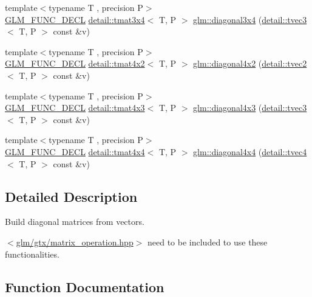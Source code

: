 \begin{DoxyCompactItemize}
\item 
{\footnotesize template$<$typename T , precision P$>$ }\\\hyperlink{setup_8hpp_ab2d052de21a70539923e9bcbf6e83a51}{G\+L\+M\+\_\+\+F\+U\+N\+C\+\_\+\+D\+E\+CL} \hyperlink{structglm_1_1detail_1_1tmat3x4}{detail\+::tmat3x4}$<$ T, P $>$ \hyperlink{group__gtx__matrix__operation_gab96c533557a191bd972300868f8111ef}{glm\+::diagonal3x4} (\hyperlink{structglm_1_1detail_1_1tvec3}{detail\+::tvec3}$<$ T, P $>$ const \&v)
\item 
{\footnotesize template$<$typename T , precision P$>$ }\\\hyperlink{setup_8hpp_ab2d052de21a70539923e9bcbf6e83a51}{G\+L\+M\+\_\+\+F\+U\+N\+C\+\_\+\+D\+E\+CL} \hyperlink{structglm_1_1detail_1_1tmat4x2}{detail\+::tmat4x2}$<$ T, P $>$ \hyperlink{group__gtx__matrix__operation_ga1ec0fc953d871fc9894bcfcc81dbaf68}{glm\+::diagonal4x2} (\hyperlink{structglm_1_1detail_1_1tvec2}{detail\+::tvec2}$<$ T, P $>$ const \&v)
\item 
{\footnotesize template$<$typename T , precision P$>$ }\\\hyperlink{setup_8hpp_ab2d052de21a70539923e9bcbf6e83a51}{G\+L\+M\+\_\+\+F\+U\+N\+C\+\_\+\+D\+E\+CL} \hyperlink{structglm_1_1detail_1_1tmat4x3}{detail\+::tmat4x3}$<$ T, P $>$ \hyperlink{group__gtx__matrix__operation_gaff804ead2f02ac48c8daf0d44a81d224}{glm\+::diagonal4x3} (\hyperlink{structglm_1_1detail_1_1tvec3}{detail\+::tvec3}$<$ T, P $>$ const \&v)
\item 
{\footnotesize template$<$typename T , precision P$>$ }\\\hyperlink{setup_8hpp_ab2d052de21a70539923e9bcbf6e83a51}{G\+L\+M\+\_\+\+F\+U\+N\+C\+\_\+\+D\+E\+CL} \hyperlink{structglm_1_1detail_1_1tmat4x4}{detail\+::tmat4x4}$<$ T, P $>$ \hyperlink{group__gtx__matrix__operation_ga0c286e9aa92074f12663617cfedfa72c}{glm\+::diagonal4x4} (\hyperlink{structglm_1_1detail_1_1tvec4}{detail\+::tvec4}$<$ T, P $>$ const \&v)
\end{DoxyCompactItemize}


\subsection{Detailed Description}
Build diagonal matrices from vectors. 

$<$\hyperlink{matrix__operation_8hpp}{glm/gtx/matrix\+\_\+operation.\+hpp}$>$ need to be included to use these functionalities. 

\subsection{Function Documentation}
\mbox{\label{group__gtx__matrix__operation_gae4177a43a89e6b4b7352f82198f2ea84}} 
